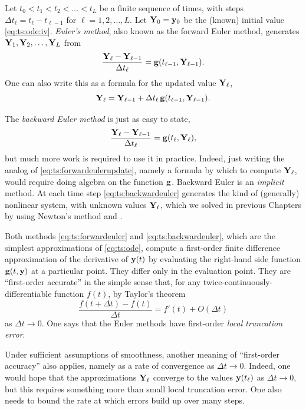 Let $t_0<t_1<t_2<\dots<t_L$ be a finite sequence of times, with steps $\Delta t_\ell = t_\ell - t_{\ell-1}$ for $\ell=1,2,\dots,L$.  Let $\mathbf{Y}_0 = \mathbf{y}_0$ be the (known) initial value  \eqref{eq:ts:ode:iv}.  \emph{Euler's method}, also known as the forward Euler method, generates $\mathbf{Y}_1,\mathbf{Y}_2,\dots,\mathbf{Y}_L$ from
\begin{equation}
\frac{\mathbf{Y}_\ell - \mathbf{Y}_{\ell-1}}{\Delta t_\ell} = \mathbf{g}(t_{\ell-1},\mathbf{Y}_{\ell-1}). \label{eq:ts:forwardeuler}
\end{equation}
One can also write this as a formula for the updated value $\mathbf{Y}_\ell$,
\begin{equation}
\mathbf{Y}_\ell = \mathbf{Y}_{\ell-1} + \Delta t_\ell \, \mathbf{g}(t_{\ell-1},\mathbf{Y}_{\ell-1}). \label{eq:ts:forwardeulerupdate}
\end{equation}

The \emph{backward Euler method} is just as easy to state,
\begin{equation}
\frac{\mathbf{Y}_\ell - \mathbf{Y}_{\ell-1}}{\Delta t_\ell} = \mathbf{g}(t_{\ell},\mathbf{Y}_{\ell}),  \label{eq:ts:backwardeuler}
\end{equation}
but much more work is required to use it in practice.  Indeed, just writing the analog of \eqref{eq:ts:forwardeulerupdate}, namely a formula by which to compute $\mathbf{Y}_\ell$, would require doing algebra on the function $\mathbf{g}$.  Backward Euler is an \emph{implicit} method.  At each time step \eqref{eq:ts:backwardeuler} generates the kind of (generally) nonlinear system, with unknown values $\mathbf{Y}_\ell$, which we solved in previous Chapters by using Newton's method and \pSNES.

Both methods \eqref{eq:ts:forwardeuler} and \eqref{eq:ts:backwardeuler}, which are the simplest approximations of \eqref{eq:ts:ode}, compute a first-order finite difference approximation of the derivative of $\mathbf{y}(t)$ by evaluating the right-hand side function $\mathbf{g}(t,\mathbf{y})$ at a particular point.  They differ only in the evaluation point.  They are ``first-order accurate'' in the simple sense that, for any twice-continuously-differentiable function $f(t)$, by Taylor's theorem
    $$\frac{f(t+\Delta t) - f(t)}{\Delta t} = f'(t) + O(\Delta t)$$
as $\Delta t \to 0$.  One says that the Euler methods have first-order \emph{local truncation error}.

Under sufficient assumptions of smoothness, another meaning of ``first-order accuracy'' also applies, namely as a rate of convergence as $\Delta t\to 0$.  Indeed, one would hope that the approximations $\mathbf{Y}_\ell$ converge to the values $\mathbf{y}(t_\ell)$ as $\Delta t\to 0$, but this requires something more than small local truncation error.  One also needs to bound the rate at which errors build up over many steps.

